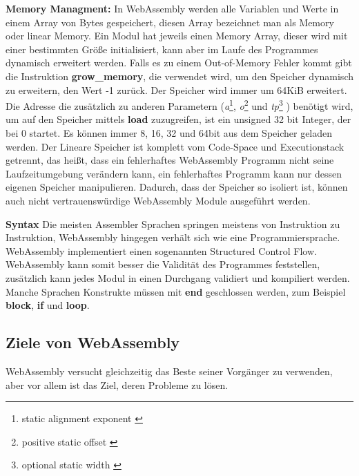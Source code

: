 \begin{flushleft}
\hfill \break

\textbf{Memory Managment:} In WebAssembly werden alle Variablen und Werte in einem Array von Bytes gespeichert, diesen Array bezeichnet man als Memory oder linear Memory. Ein Modul hat jeweils einen Memory Array, dieser wird mit einer bestimmten Größe initialisiert, kann aber im Laufe des Programmes dynamisch erweitert werden. Falls es zu einem Out-of-Memory Fehler kommt gibt die Instruktion \textbf{grow\_memory}, die verwendet wird, um den Speicher dynamisch zu erweitern, den Wert -1 zurück. Der Speicher wird immer um 64KiB erweitert. 
Die Adresse die zusätzlich zu anderen Parametern (\textit{a}\footnote{static alignment exponent \autocite[p.~188]{Haas2017}}, \textit{o}\footnote{positive static offset \autocite[p.~188]{Haas2017}} und \textit{tp}\footnote{optional static width \autocite[p.~188]{Haas2017}} ) benötigt wird, um auf den Speicher mittels \textbf{load} zuzugreifen, ist ein unsigned 32 bit Integer, der bei 0 startet. Es können immer 8, 16, 32 und 64bit aus dem Speicher geladen werden. Der Lineare Speicher ist komplett vom Code-Space und Executionstack getrennt, das heißt, dass ein fehlerhaftes WebAssembly Programm nicht seine Laufzeitumgebung verändern kann, ein fehlerhaftes Programm kann nur dessen eigenen Speicher manipulieren. Dadurch, dass der Speicher so isoliert ist, können auch nicht vertrauenswürdige WebAssembly Module ausgeführt werden. \break

\textbf{Syntax} Die meisten Assembler Sprachen springen meistens von Instruktion zu Instruktion, WebAssembly hingegen verhält sich wie eine Programmiersprache. WebAssembly implementiert einen sogenannten Structured Control Flow. WebAssembly kann somit besser die Validität des Programmes feststellen, zusätzlich kann jedes Modul in einen Durchgang validiert und kompiliert werden.
Manche Sprachen Konstrukte müssen mit \textbf{end} geschlossen werden, zum Beispiel \textbf{block}, \textbf{if} und \textbf{loop}.

\end{flushleft}

\subsection{Ziele von WebAssembly}

WebAssembly versucht gleichzeitig das Beste seiner Vorgänger zu verwenden, aber vor allem ist das Ziel, deren Probleme zu lösen.

